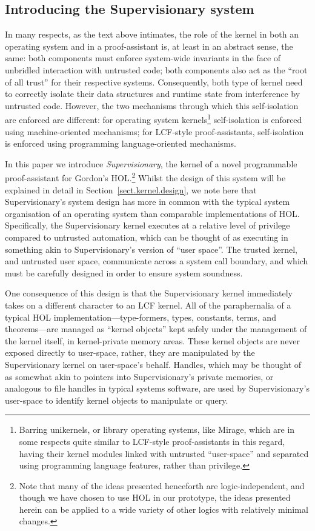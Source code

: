 \documentclass[a4paper, UKenglish, cleveref, autoref, thm-restate]{lipics-v2021}
\begin{document}
\subsection{Introducing the Supervisionary system}

In many respects, as the text above intimates, the role of the kernel in both an operating system and in a proof-assistant is, at least in an abstract sense, the same: both components must enforce system-wide invariants in the face of unbridled interaction with untrusted code; both components also act as the ``root of all trust'' for their respective systems.
Consequently, both type of kernel need to correctly isolate their data structures and runtime state from interference by untrusted code.
However, the two mechanisms through which this self-isolation are enforced are different: for operating system kernels\footnote{Barring unikernels, or library operating systems, like Mirage, which are in some respects quite similar to LCF-style proof-assistants in this regard, having their kernel modules linked with untrusted ``user-space'' and separated using programming language features, rather than privilege.} self-isolation is enforced using machine-oriented mechanisms; for LCF-style proof-assistants, self-isolation is enforced using programming language-oriented mechanisms.

In this paper we introduce \emph{Supervisionary}, the kernel of a novel programmable proof-assistant for Gordon's HOL.\footnote{Note that many of the ideas presented henceforth are logic-independent, and though we have chosen to use HOL in our prototype, the ideas presented herein can be applied to a wide variety of other logics with relatively minimal changes.}
Whilst the design of this system will be explained in detail in Section~\ref{sect.kernel.design}, we note here that Supervisionary's system design has more in common with the typical system organisation of an operating system than comparable implementations of HOL.
Specifically, the Supervisionary kernel executes at a relative level of privilege compared to untrusted automation, which can be thought of as executing in something akin to Supervisionary's version of ``user space''.
The trusted kernel, and untrusted user space, communicate across a system call boundary, and which must be carefully designed in order to ensure system soundness.

One consequence of this design is that the Supervisionary kernel immediately takes on a different character to an LCF kernel.
All of the paraphernalia of a typical HOL implementation---type-formers, types, constants, terms, and theorems---are managed as ``kernel objects'' kept safely under the management of the kernel itself, in kernel-private memory areas.
These kernel objects are never exposed directly to user-space, rather, they are manipulated by the Supervisionary kernel on user-space's behalf.
Handles, which may be thought of as somewhat akin to pointers into Supervisionary's private memories, or analogous to file handles in typical systems software, are used by Supervisionary's user-space to identify kernel objects to manipulate or query.
\end{document}
